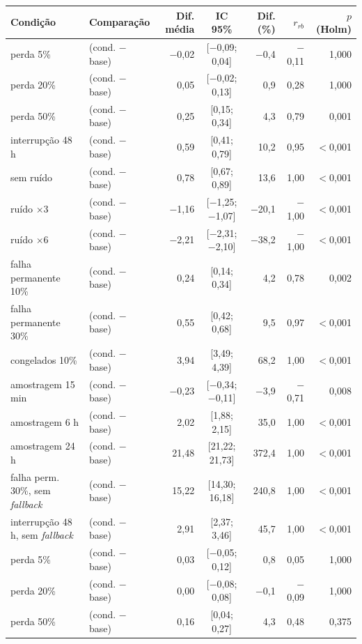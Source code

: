 \begin{tabular}{@{}llrcrrr@{}}
\toprule
Condição & Comparação & Dif. média & IC 95\% & Dif. (\%) & $r_{rb}$ & $p$ (Holm) \\
\midrule
perda 5\% & \polBOR{} (cond. $-$ base) & $-$0,02 & [$-$0,09; 0,04] & $-$0,4 & $-$0,11 & 1,000 \\
perda 20\% & \polBOR{} (cond. $-$ base) & 0,05 & [$-$0,02; 0,13] & 0,9 & 0,28 & 1,000 \\
perda 50\% & \polBOR{} (cond. $-$ base) & 0,25 & [0,15; 0,34] & 4,3 & 0,79 & 0,001 \\
interrupção 48 h & \polBOR{} (cond. $-$ base) & 0,59 & [0,41; 0,79] & 10,2 & 0,95 & $<$0,001 \\
sem ruído & \polBOR{} (cond. $-$ base) & 0,78 & [0,67; 0,89] & 13,6 & 1,00 & $<$0,001 \\
ruído $\times$3 & \polBOR{} (cond. $-$ base) & $-$1,16 & [$-$1,25; $-$1,07] & $-$20,1 & $-$1,00 & $<$0,001 \\
ruído $\times$6 & \polBOR{} (cond. $-$ base) & $-$2,21 & [$-$2,31; $-$2,10] & $-$38,2 & $-$1,00 & $<$0,001 \\
falha permanente 10\% & \polBOR{} (cond. $-$ base) & 0,24 & [0,14; 0,34] & 4,2 & 0,78 & 0,002 \\
falha permanente 30\% & \polBOR{} (cond. $-$ base) & 0,55 & [0,42; 0,68] & 9,5 & 0,97 & $<$0,001 \\
congelados 10\% & \polBOR{} (cond. $-$ base) & 3,94 & [3,49; 4,39] & 68,2 & 1,00 & $<$0,001 \\
amostragem 15 min & \polBOR{} (cond. $-$ base) & $-$0,23 & [$-$0,34; $-$0,11] & $-$3,9 & $-$0,71 & 0,008 \\
amostragem 6 h & \polBOR{} (cond. $-$ base) & 2,02 & [1,88; 2,15] & 35,0 & 1,00 & $<$0,001 \\
amostragem 24 h & \polBOR{} (cond. $-$ base) & 21,48 & [21,22; 21,73] & 372,4 & 1,00 & $<$0,001 \\
falha perm. 30\%, sem \emph{fallback} & \polBOR{} (cond. $-$ base) & 15,22 & [14,30; 16,18] & 240,8 & 1,00 & $<$0,001 \\
interrupção 48 h, sem \emph{fallback} & \polBOR{} (cond. $-$ base) & 2,91 & [2,37; 3,46] & 45,7 & 1,00 & $<$0,001 \\
perda 5\% & \polC{} (cond. $-$ base) & 0,03 & [$-$0,05; 0,12] & 0,8 & 0,05 & 1,000 \\
perda 20\% & \polC{} (cond. $-$ base) & 0,00 & [$-$0,08; 0,08] & $-$0,1 & $-$0,09 & 1,000 \\
perda 50\% & \polC{} (cond. $-$ base) & 0,16 & [0,04; 0,27] & 4,3 & 0,48 & 0,375 \\

\end{tabular}

